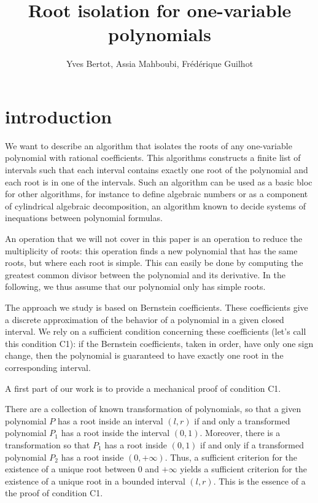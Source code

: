 \documentclass{article}
\begin{document}
\title{Root isolation for one-variable polynomials}
\author{Yves Bertot, Assia Mahboubi, Fr\'ed\'erique Guilhot}

\maketitle

\section{introduction}
We want to describe an algorithm that isolates the roots of any
one-variable polynomial with rational coefficients.  This algorithms
constructs a finite list of intervals such that each interval contains
exactly one root of the polynomial and each root is in one of the
intervals.  Such an algorithm can be used as a basic bloc for other
algorithms, for instance to define algebraic numbers or as a component
of cylindrical algebraic decomposition, an algorithm known to decide
systems of inequations between polynomial formulas.

An operation that we will not cover in this paper is an operation
 to reduce the multiplicity of roots: this operation finds a new
polynomial that has the same roots, but where each root is simple.
This can easily be done by computing the greatest
common divisor between the polynomial and its derivative.  In the
following, we thus assume that our polynomial only has simple roots.

The approach we study is based on Bernstein coefficients.  These
coefficients give a discrete approximation of the behavior of a
polynomial in a given closed interval.  We rely on a sufficient
condition concerning these coefficients (let's call this condition
C1): if the Bernstein coefficients, taken in order, have only one
sign change, then the polynomial is guaranteed to have exactly one
root in the corresponding interval.

A first part of our work is to provide a mechanical proof of condition C1.

There are a collection of known transformation of polynomials, so that 
a given polynomial \(P\) has a root inside an interval \((l,r)\) if and
only a transformed polynomial \(P_1\) has a root inside the interval \((0,1)\).
Moreover,  there is a transformation so that \(P_1\) has a root inside
\((0,1)\) if and only if a transformed polynomial \(P_2\) has a root inside
\((0,+\infty)\).  Thus, a sufficient criterion for the existence of a
unique root between 0 and \(+\infty\) yields a sufficient criterion for
the existence of a unique root in a bounded interval \((l,r)\).
This is the essence of a the proof of condition C1.
\end{document}
